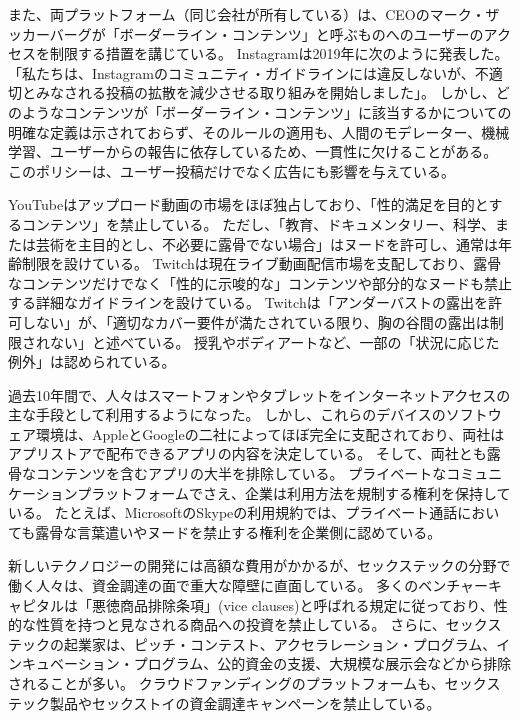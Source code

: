 \documentclass[paper=a4,book,openany]{jlreq}
\begin{document}
また、両プラットフォーム（同じ会社が所有している）は、CEOのマーク・ザッカーバーグが「ボーダーライン・コンテンツ」と呼ぶものへのユーザーのアクセスを制限する措置を講じている。
Instagramは2019年に次のように発表した。
「私たちは、Instagramのコミュニティ・ガイドラインには違反しないが、不適切とみなされる投稿の拡散を減少させる取り組みを開始しました」\citep{constine19:_instag_now_demot_vaguel_inapp_conten}。
しかし、どのようなコンテンツが「ボーダーライン・コンテンツ」に該当するかについての明確な定義は示されておらず、そのルールの適用も、人間のモデレーター、機械学習、ユーザーからの報告に依存しているため、一貫性に欠けることがある。
このポリシーは、ユーザー投稿だけでなく広告にも影響を与えている\citep{kibbe20:_faceb_has_banned_ads_kink}。

YouTubeはアップロード動画の市場をほぼ独占しており、「性的満足を目的とするコンテンツ」を禁止している。
ただし、「教育、ドキュメンタリー、科学、または芸術を主目的とし、不必要に露骨でない場合」はヌードを許可し、通常は年齢制限を設けている。
Twitchは現在ライブ動画配信市場を支配しており、露骨なコンテンツだけでなく「性的に示唆的な」コンテンツや部分的なヌードも禁止する詳細なガイドラインを設けている。
Twitchは「アンダーバストの露出を許可しない」が、「適切なカバー要件が満たされている限り、胸の谷間の露出は制限されない」と述べている。
授乳やボディアートなど、一部の「状況に応じた例外」は認められている\citep{good20:_twitc_has_new_nudit_rules_theyr_detail}。

過去10年間で、人々はスマートフォンやタブレットをインターネットアクセスの主な手段として利用するようになった。
しかし、これらのデバイスのソフトウェア環境は、AppleとGoogleの二社によってほぼ完全に支配されており、両社はアプリストアで配布できるアプリの内容を決定している。
そして、両社とも露骨なコンテンツを含むアプリの大半を排除している。
プライベートなコミュニケーションプラットフォームでさえ、企業は利用方法を規制する権利を保持している。
たとえば、MicrosoftのSkypeの利用規約では、プライベート通話においても露骨な言葉遣いやヌードを禁止する権利を企業側に認めている\citep{smith18:_micros_ban_offen_languag_skype}。

新しいテクノロジーの開発には高額な費用がかかるが、セックステックの分野で働く人々は、資金調達の面で重大な障壁に直面している。
多くのベンチャーキャピタルは「{悪徳商品排除条項}」(vice clauses)と呼ばれる規定に従っており、性的な性質を持つと見なされる商品への投資を禁止している\citep{davis19:_compan_ventur_capit_isnt_allow_inves_in}。
さらに、セックステックの起業家は、ピッチ・コンテスト、アクセラレーション・プログラム、インキュベーション・プログラム、公的資金の支援、大規模な展示会などから排除されることが多い\citep{fox19:_vibrat_center_tech_sexis_contr}。
クラウドファンディングのプラットフォームも、セックステック製品やセックストイの資金調達キャンペーンを禁止している\citep{manning17:_sextec_revol_will_not_be_crowd}。
\end{document}
